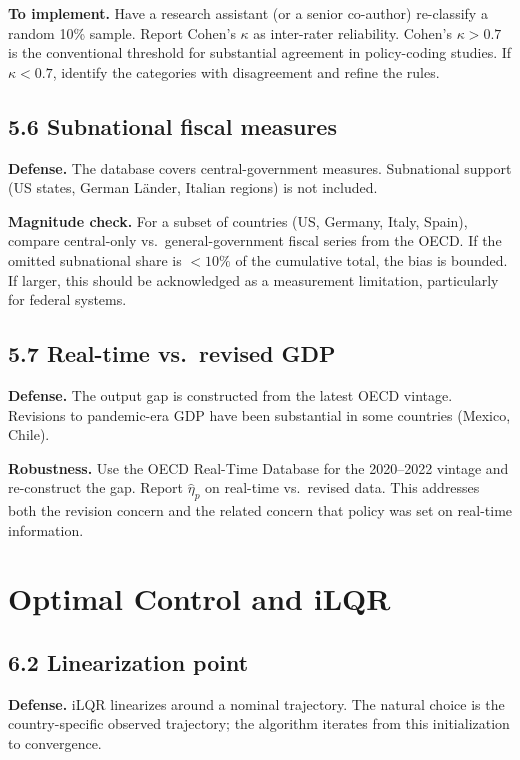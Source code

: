\documentclass[11pt,a4paper]{article}
\begin{document}
\textbf{To implement.} Have a research assistant (or a senior co-author) re-classify a random 10\% sample. Report Cohen's $\kappa$ as inter-rater reliability. Cohen's $\kappa > 0.7$ is the conventional threshold for substantial agreement in policy-coding studies. If $\kappa < 0.7$, identify the categories with disagreement and refine the rules.

\subsection*{5.6 Subnational fiscal measures}

\textbf{Defense.} The database covers central-government measures. Subnational support (US states, German Länder, Italian regions) is not included.

\textbf{Magnitude check.} For a subset of countries (US, Germany, Italy, Spain), compare central-only vs.\ general-government fiscal series from the OECD. If the omitted subnational share is $< 10\%$ of the cumulative total, the bias is bounded. If larger, this should be acknowledged as a measurement limitation, particularly for federal systems.

\subsection*{5.7 Real-time vs.\ revised GDP}

\textbf{Defense.} The output gap is constructed from the latest OECD vintage. Revisions to pandemic-era GDP have been substantial in some countries (Mexico, Chile).

\textbf{Robustness.} Use the OECD Real-Time Database for the 2020--2022 vintage and re-construct the gap. Report $\hat\eta_p$ on real-time vs.\ revised data. This addresses both the revision concern and the related concern that policy was set on real-time information.

\section{Optimal Control and iLQR}

\subsection*{6.2 Linearization point}

\textbf{Defense.} iLQR linearizes around a nominal trajectory. The natural choice is the country-specific observed trajectory; the algorithm iterates from this initialization to convergence.
\end{document}
